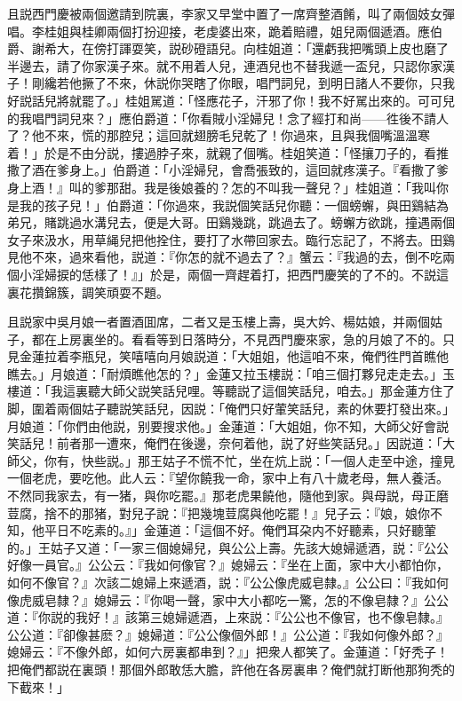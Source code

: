 且説西門慶被兩個邀請到院裏，李家又早堂中置了一席齊整酒餚，叫了兩個妓女彈唱。李桂姐與桂卿兩個打扮迎接，老虔婆出來，跪着賠禮，姐兒兩個遞酒。應伯爵、謝希大，在傍打諢耍笑，説砂磴語兒。向桂姐道：「還虧我把嘴頭上皮也磨了半邊去，請了你家漢子來。就不用着人兒，連酒兒也不替我遞一盃兒，只認你家漢子！剛纔若他撅了不來，休説你哭瞎了你眼，唱門詞兒，到明日諸人不要你，只我好説話兒將就罷了。」桂姐駡道：「怪應花子，汗邪了你！我不好駡出來的。可可兒的我唱門詞兒來？」應伯爵道：「你看賊小淫婦兒！念了經打和尚——徃後不請人了？他不來，慌的那腔兒；這回就翅膀毛兒乾了！你過來，且與我個嘴溫溫寒着！」於是不由分説，摟過脖子來，就親了個嘴。桂姐笑道：「怪攘刀子的，看推撒了酒在爹身上。」伯爵道：「小淫婦兒，會喬張致的，這回就疼漢子。『看撒了爹身上酒！』叫的爹那甜。我是後娘養的？怎的不叫我一聲兒？」桂姐道：「我叫你是我的孩子兒！」伯爵道：「你過來，我説個笑話兒你聽：一個螃蠏，與田鷄結為弟兄，賭跳過水溝兒去，便是大哥。田鷄幾跳，跳過去了。螃蠏方欲跳，撞遇兩個女子來汲水，用草䋲兒把他拴住，要打了水帶回家去。臨行忘記了，不將去。田鷄見他不來，過來看他，説道：『你怎的就不過去了？』蟹云：『我過的去，倒不吃兩個小淫婦捩的恁樣了！』」於是，兩個一齊趕着打，把西門慶笑的了不的。不説這裏花攢錦簇，調笑頑耍不題。

且説家中吳月娘一者置酒囬席，二者又是玉樓上壽，吳大妗、楊姑娘，并兩個姑子，都在上房裏坐的。看看等到日落時分，不見西門慶來家，急的月娘了不的。只見金蓮拉着李瓶兒，笑嘻嘻向月娘説道：「大姐姐，他這咱不來，俺們徃門首瞧他瞧去。」月娘道：「耐煩瞧他怎的？」金蓮又拉玉樓説：「咱三個打夥兒走走去。」玉樓道：「我這裏聽大師父説笑話兒哩。等聽説了這個笑話兒，咱去。」那金蓮方住了脚，圍着兩個姑子聽説笑話兒，因説：「俺們只好葷笑話兒，素的休要打發出來。」月娘道：「你們由他説，别要搜求他。」金蓮道：「大姐姐，你不知，大師父好會説笑話兒！前者那一遭來，俺們在後邊，奈何着他，説了好些笑話兒。」因説道：「大師父，你有，快些説。」那王姑子不慌不忙，坐在炕上説：「一個人走至中途，撞見一個老虎，要吃他。此人云：『望你饒我一命，家中上有八十歲老母，無人養活。不然同我家去，有一猪，與你吃罷。』那老虎果饒他，隨他到家。與母説，母正磨荳腐，捨不的那猪，對兒子說：『把幾塊荳腐與他吃罷！』兒子云：『娘，娘你不知，他平日不吃素的。』」金蓮道：「這個不好。俺們耳朶内不好聽素，只好聽葷的。」王姑子又道：「一家三個媳婦兒，與公公上壽。先該大媳婦遞酒，説：『公公好像一員官。』公公云：『我如何像官？』媳婦云：『坐在上面，家中大小都怕你，如何不像官？』次該二媳婦上來遞酒，説：『公公像虎威皂隸。』公公曰：『我如何像虎威皂隸？』媳婦云：『你喝一聲，家中大小都吃一驚，怎的不像皂隸？』公公道：『你説的我好！』該第三媳婦遞酒，上來説：『公公也不像官，也不像皂隸。』公公道：『卻像甚麽？』媳婦道：『公公像個外郎！』公公道：『我如何像外郎？』媳婦云：『不像外郎，如何六房裏都串到？』」把衆人都笑了。金蓮道：「好秃子！把俺們都説在裏頭！那個外郎敢恁大膽，許他在各房裏串？俺們就打断他那狗秃的下截來！」

